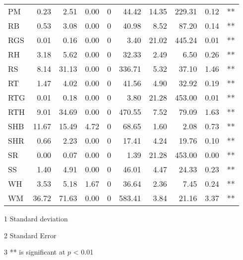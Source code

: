 \begin{landscape}
\begin{table}
\begin{threeparttable}
\begin{tabular}{lrrrrrrrrc}
PM   & 0.23   & 2.51   & 0.00   & 0 & 44.42   & 14.35    & 229.31   & 0.12  & **               \\
RB   & 0.53   & 3.08   & 0.00   & 0 & 40.98   & 8.52     & 87.20    & 0.14  & **               \\
RGS  & 0.01   & 0.16   & 0.00   & 0 & 3.40    & 21.02    & 445.24   & 0.01  & **               \\
RH   & 3.18   & 5.62   & 0.00   & 0 & 32.33   & 2.49     & 6.50     & 0.26  & **               \\
RS   & 8.14   & 31.13  & 0.00   & 0 & 336.71  & 5.32     & 37.10    & 1.46  & **               \\
RT   & 1.47   & 4.02   & 0.00   & 0 & 41.56   & 4.90     & 32.92    & 0.19  & **               \\
RTG  & 0.01   & 0.18   & 0.00   & 0 & 3.80    & 21.28    & 453.00   & 0.01  & **               \\
RTH  & 9.01   & 34.69  & 0.00   & 0 & 470.55  & 7.52     & 79.09    & 1.63  & **               \\
SHB  & 11.67  & 15.49  & 4.72   & 0 & 68.65   & 1.60     & 2.08     & 0.73  & **               \\
SHR  & 0.66   & 2.23   & 0.00   & 0 & 17.41   & 4.24     & 19.76    & 0.10  & **               \\
SR   & 0.00   & 0.07   & 0.00   & 0 & 1.39    & 21.28    & 453.00   & 0.00  & **               \\
SS   & 1.40   & 4.91   & 0.00   & 0 & 46.01   & 4.47     & 24.33    & 0.23  & **               \\
WH   & 3.53   & 5.18   & 1.67   & 0 & 36.64   & 2.36     & 7.45     & 0.24  & **               \\
WM   & 36.72  & 71.63  & 0.00   & 0 & 583.41  & 3.84     & 21.16    & 3.37  & **               \\ 
\hline
\end{tabular}
\begin{singlespacing}
\begin{tablenotes}\small
     \item[1]Standard deviation \\
     \item[2]Standard Error \\
     \item[3]** is significant at $p$ < 0.01
\end{tablenotes}
\end{singlespacing}
\end{threeparttable}
\end{table}
\end{landscape}
